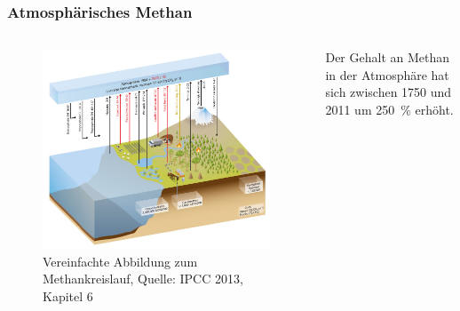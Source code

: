 \begin{frame}
	\frametitle{Atmosphärisches Methan}
	\begin{columns}
			\begin{figure}
				\centering
				\includegraphics[width=0.9\linewidth]{bilder/IPCC_Cycles_methane.jpg}
				\caption{Vereinfachte Abbildung zum Methankreislauf, Quelle: IPCC 2013, Kapitel 6}
			\end{figure}
			Der Gehalt an Methan in der Atmosphäre hat sich zwischen 1750 und 2011 um \SI{250}{\%} erhöht.
	\end{columns}


\end{frame}
